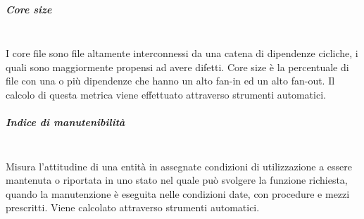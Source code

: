 \subparagraph{Core size}\mbox{}\\
I core file sono file altamente interconnessi da una catena di dipendenze cicliche, i quali sono maggiormente propensi ad avere difetti. Core size è la percentuale di file con una o più dipendenze che hanno un alto fan-in ed un alto fan-out. Il calcolo di questa metrica viene effettuato attraverso strumenti automatici.

\subparagraph{Indice di manutenibilità}\mbox{}\\
Misura l’attitudine di una entità in assegnate condizioni di utilizzazione a essere mantenuta o riportata in uno stato nel quale può svolgere la funzione richiesta, quando la manutenzione è eseguita nelle condizioni date, con procedure e mezzi prescritti. Viene calcolato attraverso strumenti automatici.

